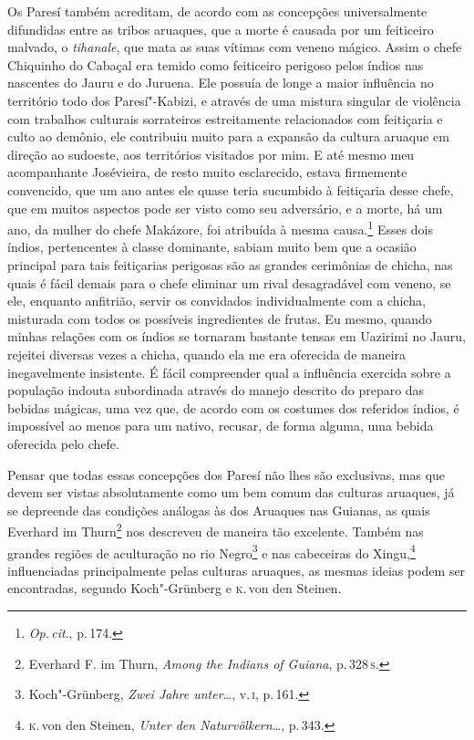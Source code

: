 Os Paresí também acreditam, de acordo com as concepções universalmente
difundidas entre as tribos aruaques, que a morte é causada por um
feiticeiro malvado, o \textit{tihanale}, que mata as suas vítimas com
veneno mágico. Assim o chefe Chiquinho do Cabaçal era temido como
feiticeiro perigoso pelos índios nas nascentes do Jauru e do Juruena.
Ele possuía de longe a maior influência no território todo dos
Paresí"-Kabizi, e através de uma mistura singular de violência com
trabalhos culturais sorrateiros estreitamente relacionados com
feitiçaria e culto ao demônio, ele contribuiu muito para a expansão da
cultura aruaque em direção ao sudoeste, aos territórios visitados por
mim. E até mesmo meu acompanhante Josévieira, de resto muito
esclarecido, estava firmemente convencido, que um ano antes ele quase
teria sucumbido à feitiçaria desse chefe, que em muitos aspectos pode
ser visto como seu adversário, e a morte, há um ano, da mulher do chefe
Makázore, foi atribuída à mesma causa.\footnote{\textit{Op.\,cit}., p.\,174.} Esses dois índios, pertencentes à classe dominante, sabiam
muito bem que a ocasião principal para tais feitiçarias perigosas são
as grandes cerimônias de chicha, nas quais é fácil demais para o chefe
eliminar um rival desagradável com veneno, se ele, enquanto anfitrião,
servir os convidados individualmente com a chicha, misturada com todos
os possíveis ingredientes de frutas. Eu mesmo, quando minhas relações
com os índios se tornaram bastante tensas em Uazirimi no Jauru,
rejeitei diversas vezes a chicha, quando ela me era oferecida de
maneira inegavelmente insistente. É fácil compreender qual a influência
exercida sobre a população indouta subordinada através do manejo
descrito do preparo das bebidas mágicas, uma vez que, de acordo com os
costumes dos referidos índios, é impossível ao menos para um nativo,
recusar, de forma alguma, uma bebida oferecida pelo chefe.

Pensar que todas essas concepções dos Paresí não lhes são exclusivas,
mas que devem ser vistas absolutamente como um bem comum das culturas
aruaques, já se depreende das condições análogas às dos Aruaques nas
Guianas, as quais Everhard im Thurn\footnote{Everhard F. im Thurn,
  \textit{Among the Indians of Guiana}, p.\,328\,\textsc{s}.} nos descreveu de
maneira tão excelente. Também nas grandes regiões de aculturação no rio
Negro\footnote{Koch"-Grünberg, \textit{Zwei Jahre unter\ldots}, v.\,\textsc{i}, p.\,161.} e nas cabeceiras do Xingu,\footnote{\textsc{k}.\,von den
  Steinen, \textit{Unter den Naturvölkern\ldots}, p.\,343.}
influenciadas principalmente pelas culturas aruaques, as mesmas ideias
podem ser encontradas, segundo Koch"-Grünberg e \textsc{k}.\,von den Steinen.

